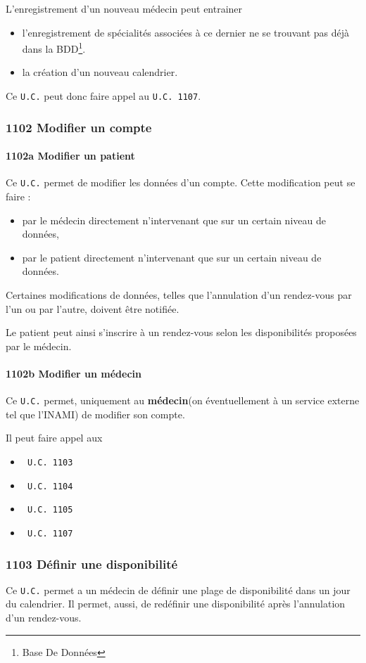 L'enregistrement d'un nouveau médecin peut entrainer 
\begin{itemize}
	\item l'enregistrement de	spécialités associées à ce dernier ne se trouvant pas déjà dans la 
		BDD\footnote{Base De Données}.
	\item la création d'un nouveau calendrier.
\end{itemize}
Ce \texttt{U.C.} peut donc faire appel au \texttt{U.C. 1107}.
\subsubsection{1102 Modifier un compte}

\paragraph{1102a Modifier un patient}
Ce \texttt{U.C.} permet de modifier les données d'un compte. Cette modification
peut se faire :
\begin{itemize}
	\item par le médecin directement n'intervenant que sur un certain niveau de
		données,
	\item par le patient directement n'intervenant que sur un certain niveau de
		données.
\end{itemize}

Certaines modifications de données, telles que l'annulation d'un rendez-vous par
l'un ou par l'autre, doivent être notifiée.

Le patient peut ainsi s'inscrire à un rendez-vous selon les disponibilités
proposées par le médecin.
\paragraph{1102b Modifier un médecin}
Ce \texttt{U.C.} permet, uniquement au \textbf{médecin}(on éventuellement à un
service externe tel que l'INAMI) de modifier son compte.

Il peut faire appel aux 
\begin{itemize}
	\item \texttt{~U.C. 1103} 
	\item \texttt{~U.C. 1104} 
	\item \texttt{~U.C. 1105}
	\item \texttt{~U.C. 1107}
\end{itemize}

\subsubsection{\label{1103}1103 Définir une disponibilité}
Ce \texttt{U.C.} permet a un médecin de définir une plage de disponibilité dans
un jour du calendrier. Il permet, aussi, de redéfinir une disponibilité après
l'annulation d'un rendez-vous.
